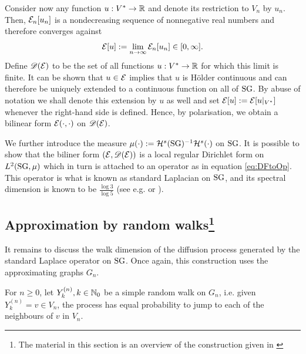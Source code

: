 Consider now any function $u:V^*\to\mathbb{R}$ and denote its restriction to $V_n$ by $u_n$. Then, $\mathcal{E}_n[u_n]$ is a nondecreasing sequence of nonnegative real numbers and therefore converges against 
\[
  \mathcal{E}[u]:=\lim_{n\to\infty} \mathcal{E}_n[u_n]\in[0,\infty].
\]
Define $\mathscr{D}(\mathcal{E})$ to be the set of all functions $u:V^*\to\mathbb{R}$ for which this limit is finite. It can be shown that $u\in\mathcal{E}$ implies that $u$ is H\"older continuous and can therefore be uniquely extended to a continuous function on all of $\operatorname{SG}$. By abuse of notation we shall denote this extension by $u$ as well and set $\mathcal{E}[u]:=\mathcal{E}[u|_{V^*}]$ whenever the right-hand side is defined. Hence, by polarisation, we obtain a bilinear form $\mathcal{E}(\cdot,\cdot)$ on $\mathscr{D}(\mathcal{E})$. 

We further introduce the measure 
$\mu(\cdot):=\mathcal{H}^s(\operatorname{SG})^{-1}\mathcal{H}^s(\cdot)$ on $\operatorname{SG}$. It is possible to show that the biliner form $(\mathcal{E},\mathscr{D}(\mathcal{E}))$ is a local regular Dirichlet form on $L^2(\operatorname{SG},\mu)$ which in turn is attached to an operator as in equation \eqref{eq:DFtoOp}. This operator is what is known as standard Laplacian on $\operatorname{SG}$, and its spectral dimension is known to be $\frac{\log 3}{\log 5}$ (see e.g. \cite[section 3.5]{strichartz2006differential} or \cite{kigami1993weyl}). 

\subsection[Approximation by random walks]{Approximation by random walks\protect\footnote{The material in this section is an overview of the construction given in \cite[chapter II]{barlow1998diffusions}}}

It remains to discuss the walk dimension of the diffusion process generated by the standard Laplace operator on $\operatorname{SG}$. Once again, this construction uses the approximating graphs $G_n$. 

For $n\geq0$, let $Y^{(n)}_k, k\in\mathbb{N}_0$ be a simple random walk on $G_n$, i.e. given $Y^{(n)}_k=v\in V_n$, the process has equal probability to jump to each of the neighbours of $v$ in $V_n$. 


